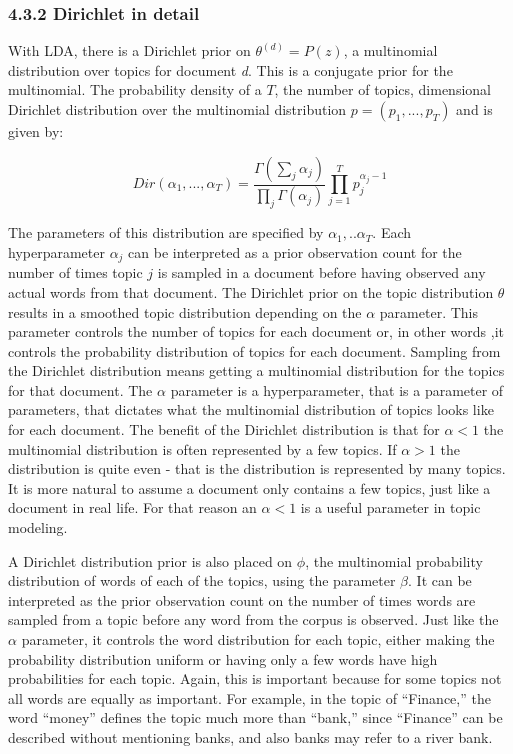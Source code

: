 \documentclass[
]{article}
\begin{document}
\hypertarget{dirichlet-in-detail}{%
\subsubsection{4.3.2 Dirichlet in detail}\label{dirichlet-in-detail}}

With LDA, there is a Dirichlet prior on \({\theta}^{(d)} = P(z)\), a
multinomial distribution over topics for document \emph{d}. This is a
conjugate prior for the multinomial. The probability density of a \(T\),
the number of topics, dimensional Dirichlet distribution over the
multinomial distribution \(p=(p_1,...,p_T)\) and is given by:

\begin{equation}
Dir(\alpha_1,...,\alpha_T) =  \frac{\Gamma(\sum_{j}^{}\alpha_j)}{\prod_{j}^{}\Gamma(\alpha_j)}\prod_{j=1}^{T}p_j^{\alpha_j -1}
\end{equation}

The parameters of this distribution are specified by
\(\alpha_1,..\alpha_T\). Each hyperparameter \(\alpha_j\) can be
interpreted as a prior observation count for the number of times topic
\(j\) is sampled in a document before having observed any actual words
from that document. The Dirichlet prior on the topic distribution
\(\theta\) results in a smoothed topic distribution depending on the
\(\alpha\) parameter. This parameter controls the number of topics for
each document or, in other words ,it controls the probability
distribution of topics for each document. Sampling from the Dirichlet
distribution means getting a multinomial distribution for the topics for
that document. The \(\alpha\) parameter is a hyperparameter, that is a
parameter of parameters, that dictates what the multinomial distribution
of topics looks like for each document. The benefit of the Dirichlet
distribution is that for \(\alpha<1\) the multinomial distribution is
often represented by a few topics. If \(\alpha>1\) the distribution is
quite even - that is the distribution is represented by many topics. It
is more natural to assume a document only contains a few topics, just
like a document in real life. For that reason an \(\alpha<1\) is a
useful parameter in topic modeling.

A Dirichlet distribution prior is also placed on \(\phi\), the
multinomial probability distribution of words of each of the topics,
using the parameter \(\beta\). It can be interpreted as the prior
observation count on the number of times words are sampled from a topic
before any word from the corpus is observed. Just like the \(\alpha\)
parameter, it controls the word distribution for each topic, either
making the probability distribution uniform or having only a few words
have high probabilities for each topic. Again, this is important because
for some topics not all words are equally as important. For example, in
the topic of ``Finance,'' the word ``money'' defines the topic much more
than ``bank,'' since ``Finance'' can be described without mentioning
banks, and also banks may refer to a river bank.
\end{document}
